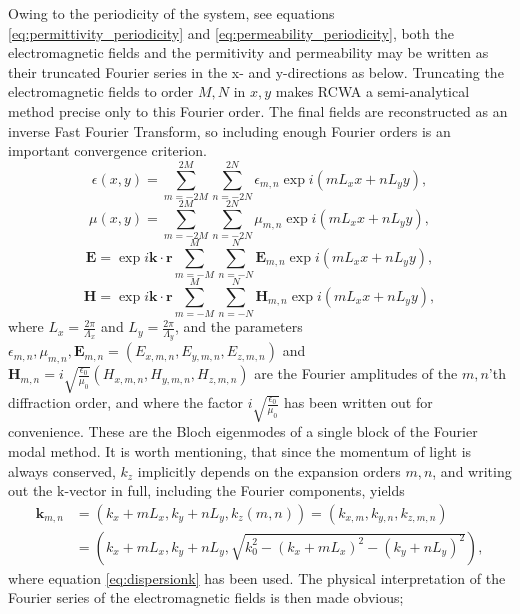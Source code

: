 Owing to the periodicity of the system, see equations \ref{eq:permittivity_periodicity} and  \ref{eq:permeability_periodicity}, both the electromagnetic fields and the permitivity and permeability may
be written as their truncated Fourier series in the x- and y-directions as below. Truncating the electromagnetic fields to order $M,N$ in $x,y$ makes RCWA a semi-analytical method
precise only to this Fourier order. The final fields are reconstructed as an inverse Fast Fourier Transform, so including enough Fourier orders is an important convergence criterion.
\begin{equation}
\label{eq:FourierPermitivity}
\epsilon(x,y) = \sum_{m=-2M}^{2M}\sum_{n=-2N}^{2N}\epsilon_{m,n}\exp{i(mL_xx+nL_yy)},
\end{equation}
\begin{equation}
\label{eq:FourierPermeability}
\mu(x,y) = \sum_{m=-2M}^{2M}\sum_{n=-2N}^{2N}\mu_{m,n}\exp{i(mL_xx+nL_yy)},
\end{equation}
\begin{equation}
\label{eq:FourierFaraday}
\mathbf{E} = \exp{i\mathbf{k}\cdot\mathbf{r}}\sum_{m=-M}^{M}\sum_{n=-N}^{N}\mathbf{E}_{m,n}\exp{i(mL_xx+nL_yy)},
\end{equation}
\begin{equation}
\label{eq:FourierAmpere}
\mathbf{H} = \exp{i\mathbf{k}\cdot\mathbf{r}}\sum_{m=-M}^{M}\sum_{n=-N}^{N}\mathbf{H}_{m,n}\exp{i(mL_xx+nL_yy)},
\end{equation}
where $L_x = \frac{2\pi}{\Lambda_x}$ and $L_y = \frac{2\pi}{\Lambda_y}$, 
and the parameters $\epsilon_{m,n}, \mu_{m,n}, \mathbf{E}_{m,n} = (E_{x,m,n},E_{y,m,n},E_{z,m,n})$ and $\mathbf{H}_{m,n} = i\sqrt{\frac{\epsilon_0}{\mu_0}} (H_{x,m,n},H_{y,m,n},H_{z,m,n})$ are the Fourier amplitudes of the $m,n$'th diffraction order, and where the factor $i\sqrt{\frac{\epsilon_0}{\mu_0}}$ has been written out for convenience.
These are the Bloch eigenmodes of a single block of the Fourier modal method.
It is worth mentioning, that since the momentum of light is always conserved, $k_z$ implicitly depends on the expansion orders $m,n$, and writing out the k-vector in full, including the Fourier components, yields
\begin{align}
\label{eq:kmn}
\mathbf{k}_{m,n} &= (k_x+mL_x,k_y+nL_y,k_z(m,n)) = (k_{x,m},k_{y,n},k_{z,m,n}) \\ &= \left(k_x+mL_x,k_y+nL_y,\sqrt{k_0^2-(k_x+mL_x)^2-(k_y+nL_y)^2}\right),
\end{align}
where equation \ref{eq:dispersionk} has been used. The physical interpretation of the Fourier series of the electromagnetic fields is then made obvious;
